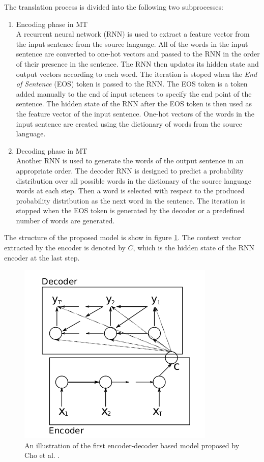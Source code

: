 \documentclass[preprint, 12pt]{elsarticle}
\begin{document}
		The translation process is divided into the following two subprocesses:
		\begin{enumerate}
			\item Encoding phase in MT \\
			A recurrent neural network (RNN) is used to extract a feature vector from the input sentence from the source language. All of the words in the input sentence are converted to one-hot vectors and passed to the RNN in the order of their presence in the sentence. The RNN then updates its hidden state and output vectors according to each word. The iteration is stoped when the \textit{End of Sentence} (EOS) token is passed to the RNN. The EOS token is a token added manually to the end of input setences to specify the end point of the sentence. The hidden state of the RNN after the EOS token is then used as the feature vector of the input sentence. One-hot vectors of the words in the input sentence are created using the dictionary of words from the source language.
			\item Decoding phase in MT \\
			Another RNN is used to generate the words of the output sentence in an appropriate order. The decoder RNN is designed to predict a probability distribution over all possible words in the dictionary of the source language words at each step. Then a word is selected with respect to the produced probability distribution as the next word in the sentence. The iteration is stopped when the EOS token is generated by the decoder or a predefined number of words are generated.
		\end{enumerate}
		
		The structure of the proposed model is show in figure \ref{fig:encdec1}. The context vector extracted by the encoder is denoted by $C$, which is the hidden state of the RNN encoder at the last step.
		\begin{figure}[h]
			\centering
			\includegraphics[scale=0.6]{Imgs/encdec1.png}
			\caption{An illustration of the first encoder-decoder based model proposed by Cho et al. \cite{cho2014learning}.}
			\label{fig:encdec1}
		\end{figure}
		
\end{document}
